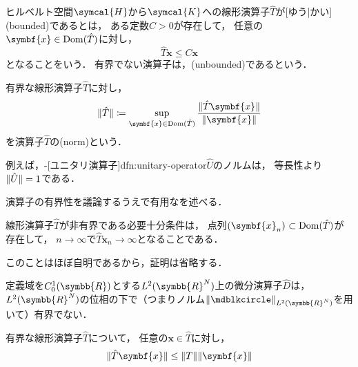 \documentclass[../sotsu.tex]{subfiles}
\begin{document}
\begin{definition}[有界な演算子]
    \label{dfn:bounded-operator}
    ヒルベルト空間$\symcal{H}$から$\symcal{K}$への線形演算子$\hat{T}$が[ゆう|かい](bounded)であるとは，
    ある定数$C > 0$が存在して，
    任意の$\symbf{x} \in \domain(\hat{T})$に対し，
    \begin{equation*}
        \hat{T} \symbf{x} \leq C \symbf{x}
    \end{equation*}
    となることをいう．
    有界でない演算子は，(unbounded)であるという．
\end{definition}

\begin{definition}[演算子ノルム]
    \label{dfn:operator-norm}
    有界な線形演算子$\hat{T}$に対し，
    \begin{equation}
        \opnorm{\hat{T}} \coloneq \sup_{\symbf{x} \in \domain(\hat{T})} \frac{\norm{\hat{T} \symbf{x}}}{\norm{\symbf{x}}}
    \end{equation}
    を演算子$\hat{T}$の(norm)という．
\end{definition}

例えば，-[ユニタリ演算子]{dfn:unitary-operator}$\hat{U}$のノルムは，
等長性より$\lVert\hat{U}\rVert = 1$である．

演算子の有界性を議論するうえで有用なを述べる．

\begin{proposition}
    \label{thm:unbounded-operator-iff}
    線形演算子$\hat{T}$が非有界である必要十分条件は，
    点列$\sequ{\symbf{x}_n} \subset \domain(\hat{T})$が存在して，
    $n \to \infty$で$\hat{T} \symbf{x}_n \to \infty$となることである．
\end{proposition}

このことはほぼ自明であるから，証明は省略する．


\begin{proposition}
    定義域を$C_0^1 (\symbb{R})$とする$L^2 (\symbb{R}^N)$上の微分演算子$\hat{D}$は，
    $L^2 (\symbb{R}^N)$の位相の下で（つまりノルム$\norm{\bigdot}_{L^2 (\symbb{R}^N)}$を用いて）有界でない．
\end{proposition}


\begin{lemma}
    \label{thm:norm-and-operator-norm}
    有界な線形演算子$\hat{T}$について，
    任意の$\symbf{x} \in \hat{T}$に対し，
    \begin{equation*}
        \norm{\hat{T} \symbf{x}} \leq \opnorm{T} \norm{\symbf{x}}
    \end{equation*}
\end{lemma}
\end{document}
